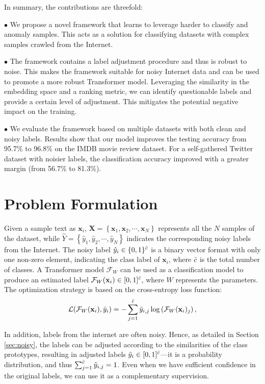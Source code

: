 \documentclass[letterpaper]{article} \usepackage{aaai22}  \usepackage{times}  \usepackage{helvet}  \usepackage{courier}  \usepackage{amsmath,amssymb}
\begin{document}
In summary, the contributions are threefold:

\noindent $\bullet$ We propose a novel framework that learns to leverage harder to classify and anomaly samples. This acts as a solution for classifying datasets with complex samples crawled from the Internet. 
 
\noindent $\bullet$ The framework contains a label adjustment procedure and thus is robust to noise. This makes the framework suitable for noisy Internet data and can be used to promote a more robust Transformer model. Leveraging the similarity in the embedding space and a ranking metric, we can identify questionable labels and provide a certain level of adjustment. This mitigates the potential negative impact on the training.
 
 
\noindent $\bullet$ We evaluate the framework based on multiple datasets with both clean and noisy labels. Results show that our model improves the testing accuracy from 95.7\% to 96.8\% on the IMDB movie review dataset. For a self-gathered Twitter dataset with noisier labels, the classification accuracy improved with a greater margin  (from 56.7\% to 81.3\%).
\medskip 

 \section{Problem Formulation}
\label{section-preliminary}
Given a sample text as $\mathbf{x}_{i}$, $\mathbf{X}=\left\{\mathbf{x}_{1}, \mathbf{x}_{2}, \cdots, \mathbf{x}_{N}\right\}$ represents all the $N$ samples of the dataset, while $\hat{Y}=\left\{\hat{y}_{1}, \hat{y}_{2}, \cdots, \hat{y}_{N}\right\}$ indicates the corresponding noisy labels from the Internet.
The noisy label $\hat{y}_{i} \in \{0,1\}^{\Bar{c}}$ is a binary vector format with only one non-zero element, indicating the class label of
$\mathbf{x}_{i}$, where $\Bar{c}$ is the total number of classes.
A Transformer model $\mathcal{F}_W$ can be used as a classification model to produce an estimated label $\mathcal{F}_W(\mathbf{x}_{i}) \in [0,1]^{\Bar{c}}$, where $W$ represents the parameters.
The optimization strategy is based on the cross-entropy loss function:
\begin{equation}
\mathcal{L}(\mathcal{F}_{W}(\mathbf{x}_i), \Tilde{y}_i)=
-\sum_{j=1}^{\Bar{c}} \Tilde{y}_{i,j} \log \left(\mathcal{F}_{W}(\mathbf{x}_i)_j\right),
\end{equation}

In addition, labels from the internet are often noisy. Hence, as detailed in Section \ref{sec:noisy}, the labels can be adjusted according to the similarities of the class prototypes, resulting in adjusted labels $\Tilde{y}_i\in [0,1]^{\Bar{c}}$---it is a probability distribution, and thus $\sum_{j=1}^{\Bar{c}} \Tilde{y}_{i,j} = 1$. Even when we have sufficient confidence in the original labels, we can use it as a complementary supervision.
\end{document}
